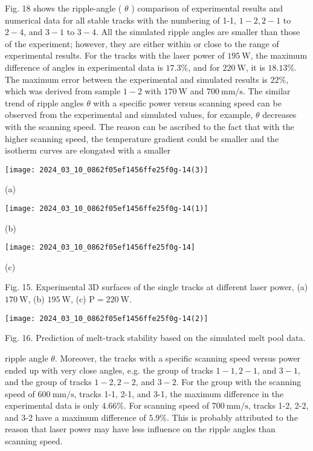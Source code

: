 \documentclass[10pt]{article}
\begin{document}
Fig. 18 shows the ripple-angle ( $\theta$ ) comparison of experimental results and numerical data for all stable tracks with the numbering of 1-1, $1-2,2-1$ to $2-4$, and $3-1$ to $3-4$. All the simulated ripple angles are smaller than those of the experiment; however, they are either within or close to the range of experimental results. For the tracks with the laser power of $195 \mathrm{~W}$, the maximum difference of angles in experimental data is $17.3 \%$, and for $220 \mathrm{~W}$, it is $18.13 \%$. The maximum error between the experimental and simulated results is $22 \%$, which was derived from sample $1-2$ with $170 \mathrm{~W}$ and $700 \mathrm{~mm} / \mathrm{s}$. The similar trend of ripple angles $\theta$ with a specific power versus scanning speed can be observed from the experimental and simulated values, for example, $\theta$ decreases with the scanning speed. The reason can be ascribed to the fact that with the higher scanning speed, the temperature gradient could be smaller and the isotherm curves are elongated with a smaller

\begin{center}
\texttt{[image: 2024\_03\_10\_0862f05ef1456ffe25f0g-14(3)]}
\end{center}

(a)

\begin{center}
\texttt{[image: 2024\_03\_10\_0862f05ef1456ffe25f0g-14(1)]}
\end{center}

(b)

\begin{center}
\texttt{[image: 2024\_03\_10\_0862f05ef1456ffe25f0g-14]}
\end{center}

(c)

Fig. 15. Experimental 3D surfaces of the single tracks at different laser power, (a) $170 \mathrm{~W}$, (b) $195 \mathrm{~W}$, (c) $\mathrm{P}=220 \mathrm{~W}$.

\begin{center}
\texttt{[image: 2024\_03\_10\_0862f05ef1456ffe25f0g-14(2)]}
\end{center}

Fig. 16. Prediction of melt-track stability based on the simulated melt pool data.

ripple angle $\theta$. Moreover, the tracks with a specific scanning speed versus power ended up with very close angles, e.g. the group of tracks $1-1,2-1$, and $3-1$, and the group of tracks $1-2,2-2$, and $3-2$. For the group with the scanning speed of $600 \mathrm{~mm} / \mathrm{s}$, tracks 1-1, 2-1, and 3-1, the maximum difference in the experimental data is only $4.66 \%$. For scanning speed of $700 \mathrm{~mm} / \mathrm{s}$, tracks 1-2, 2-2, and 3-2 have a maximum difference of $5.9 \%$. This is probably attributed to the reason that laser power may have less influence on the ripple angles than scanning speed.
\end{document}
